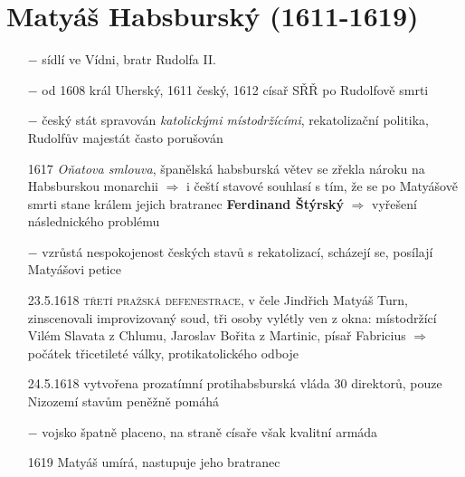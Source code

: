 \documentclass{article}
\begin{document}
\section*{Matyáš Habsburský (1611-1619)}
\begin{itemize}
    \vspace{-0.5em}
    \setlength\itemsep{0.15em}
    \item[$-$] sídlí ve Vídni, bratr Rudolfa II.
    \item[$-$] od 1608 král Uherský, 1611 český, 1612 císař SŘŘ po Rudolfově smrti
    \item[$-$] český stát spravován \textit{katolickými místodržícími}, rekatolizační politika, Rudolfův majestát často porušován
    \item[1617] \textit{Oňatova smlouva}, španělská habsburská větev se zřekla nároku na Habsburskou monarchii $\Rightarrow$ i čeští stavové souhlasí s tím, že se po Matyášově smrti stane králem jejich bratranec \textbf{Ferdinand Štýrský} $\Rightarrow$ vyřešení následnického problému
    \item[$-$]  vzrůstá nespokojenost českých stavů s rekatolizací, scházejí se, posílají Matyášovi petice
    \item[23.5.1618] \textsc{třetí pražská defenestrace}, v čele Jindřich Matyáš Turn, zinscenovali improvizovaný soud, tři osoby vylétly ven z okna: místodržící Vilém Slavata z Chlumu, Jaroslav Bořita z Martinic, písař Fabricius $\Rightarrow$  počátek třicetileté války, protikatolického odboje
    \item[24.5.1618] vytvořena prozatímní protihabsburská vláda 30 direktorů, pouze Nizozemí stavům peněžně pomáhá
    \item[$-$] vojsko špatně placeno, na straně císaře však kvalitní armáda
    \item[1619] Matyáš umírá, nastupuje jeho bratranec
\end{itemize}
\end{document}
